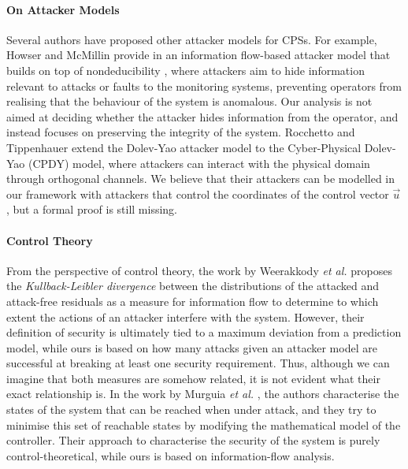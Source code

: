 {{\paragraph{On Attacker Models} Several authors have proposed other attacker models for CPSs. For example, Howser and McMillin provide in \cite{StuxnetOnCPS} an information flow-based attacker model that builds on top of nondeducibility \cite{Nondeducibility}, where attackers aim to hide information relevant to attacks or faults to the monitoring systems, preventing operators from realising that the behaviour of the system is anomalous. Our analysis is not aimed at deciding whether the attacker hides information from the operator, and instead focuses on preserving the integrity of the system. Rocchetto and Tippenhauer \cite{CPSDolevYao} extend the Dolev-Yao attacker model \cite{DolevYao} to the Cyber-Physical Dolev-Yao (CPDY) model, where attackers can interact with the physical domain through orthogonal channels. We believe that their attackers can be modelled in our framework with attackers that control the coordinates of the control vector $\vec{u}$, but a formal proof is still missing.
}

\paragraph{Control Theory} From the perspective of control theory, the work by Weerakkody \emph{et al.} \cite{IFCPSSec} proposes the \emph{Kullback-Leibler divergence} between the distributions of the attacked and attack-free residuals as {a measure for information flow} to determine to which extent the actions of an attacker interfere with the system. However, their definition of security is ultimately tied to a maximum deviation from a prediction model, while ours is based on how many attacks given an attacker model are successful at breaking at least one security requirement. Thus, although we can imagine that both measures are somehow related, it is not evident what their exact relationship is. In the work by Murguia \emph{et al.} \cite{ReachableSets}, the authors characterise the states of the system that can be reached when under attack, and they try to minimise this set of reachable states by modifying the mathematical model of the controller. Their approach to characterise the security of the system is purely control-theoretical, while ours is based on information-flow analysis.

}

